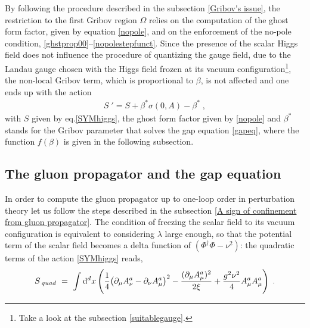 By following the procedure described in the subsection \ref{Gribov's issue}, the restriction to
the first Gribov region $\Omega$ relies on the computation of the ghost form factor, given by
equation \eqref{nopole}, and on the enforcement of the no-pole condition,
\eqref{ghstprop00}--\eqref{nopolestepfunct}. Since the presence of the scalar Higgs field does
not influence the procedure of quantizing the gauge field, due to the Landau gauge chosen with
the Higgs field frozen at its vacuum configuration\footnote{Take a look at the subsection
\ref{suitablegauge}.}, the non-local Gribov term, which is proportional to $\beta$, is not affected and one ends up with the action
\begin{eqnarray}
S\;' = S + \beta^* \sigma(0,A) -\beta^*   \;,
\label{effctactsu2}
\end{eqnarray}
with $S$ given by eq.\eqref{SYMhiggs}, the ghost form factor given by \eqref{nopole} and
$\beta^{\ast}$ stands for the Gribov parameter that solves the gap equation \eqref{gapeq},
where the function $f(\beta)$ is given in the following subsection.








\subsection{The gluon propagator and the gap equation}

In order to compute the gluon propagator up to one-loop order in perturbation theory let us
follow the steps described in the subsection \ref{A sign of confinement from gluon
propagator}. The condition of freezing the scalar field to its vacuum configuration is
equivalent to considering $\lambda$ large enough, so that the potential term of the scalar
field becomes a delta function of $\left(\Phi ^{\dagger}\Phi-\nu ^{2}\right)$: the quadratic
terms of the action \eqref{SYMhiggs} reads,
\begin{eqnarray}
S\,_{quad} ~=~ \int \mathrm{d}^{d}x\left( \frac{1}{4} { \left(  \partial_\mu A^a_\nu -\partial_\nu
A^a_\mu  \right)} ^2 - \frac{(\partial _{\mu }A_{\mu}^{a})^{2}}{2\xi}  +
\frac{g^{2}\nu^{2}}{4}A_{\mu }^{a}A_{\mu }^{a}  \right)
\;.
\label{quadf}
\end{eqnarray}

